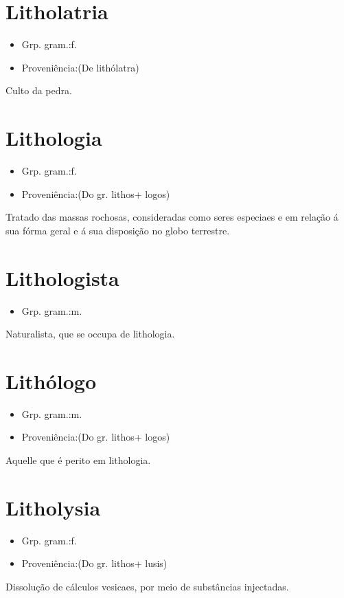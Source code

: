 \section{Litholatria}
\begin{itemize}
\item {Grp. gram.:f.}
\end{itemize}
\begin{itemize}
\item {Proveniência:(De \textunderscore lithólatra\textunderscore )}
\end{itemize}
Culto da pedra.
\section{Lithologia}
\begin{itemize}
\item {Grp. gram.:f.}
\end{itemize}
\begin{itemize}
\item {Proveniência:(Do gr. \textunderscore lithos\textunderscore  + \textunderscore logos\textunderscore )}
\end{itemize}
Tratado das massas rochosas, consideradas como seres especiaes e em relação á sua fórma geral e á sua disposição no globo terrestre.
\section{Lithologista}
\begin{itemize}
\item {Grp. gram.:m.}
\end{itemize}
Naturalista, que se occupa de lithologia.
\section{Lithólogo}
\begin{itemize}
\item {Grp. gram.:m.}
\end{itemize}
\begin{itemize}
\item {Proveniência:(Do gr. \textunderscore lithos\textunderscore  + \textunderscore logos\textunderscore )}
\end{itemize}
Aquelle que é perito em lithologia.
\section{Litholysia}
\begin{itemize}
\item {Grp. gram.:f.}
\end{itemize}
\begin{itemize}
\item {Proveniência:(Do gr. \textunderscore lithos\textunderscore  + \textunderscore lusis\textunderscore )}
\end{itemize}
Dissolução de cálculos vesicaes, por meio de substâncias injectadas.
